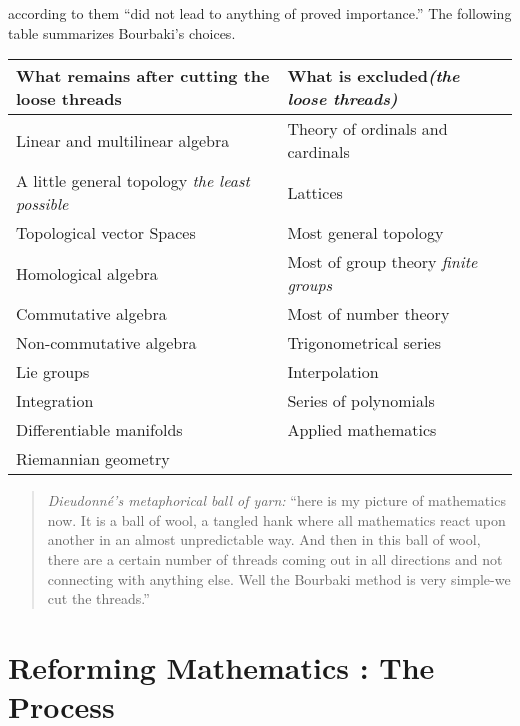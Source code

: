 \documentclass[12pt]{article}
\begin{document}
according to them ``did not lead to anything of proved importance.''\cite{DJ} 
The following table summarizes Bourbaki's choices.
\begin{center}
\scriptsize\begin{tabular}{|l|l|} \hline
\textbf{What remains after cutting the loose threads} & \textbf{What is 
excluded\textsl{(the loose threads)}} \\ \hline
Linear and multilinear algebra & Theory of ordinals and cardinals \\
A little general topology \textsl{the least possible} & Lattices \\
Topological vector Spaces & Most general topology \\
Homological algebra & Most of group theory \textsl{finite groups} \\
Commutative algebra & Most of number theory \\
Non-commutative algebra & Trigonometrical series \\
Lie groups & Interpolation \\
Integration & Series of polynomials \\
Differentiable manifolds & Applied mathematics \\
Riemannian geometry &  \\ \hline 
\end{tabular}
\end{center}
\begin{quote}
\footnotesize\emph{Dieudonn\'e's metaphorical ball of yarn:} ``here is 
my picture of mathematics now. It is a ball of wool, a tangled hank where 
all mathematics react upon another in an almost unpredictable way. And 
then in this ball of wool, there are a certain number of threads coming 
out in all directions and not connecting with anything else. Well the 
Bourbaki method is very simple-we cut the threads.''\cite{DJ}  
\end{quote}
\normalsize


\section*{Reforming Mathematics : The Process}\normalsize
\end{document}
